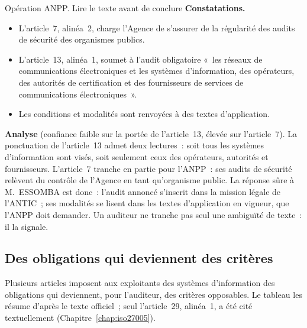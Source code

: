 \begin{boxscenario}{Opération ANPP. Lire le texte avant de conclure}
\textbf{Constatations.}
\begin{itemize}
    \item L'article~7, alinéa~2, charge l'Agence de s'assurer de la
          régularité des audits de sécurité des organismes publics.
    \item L'article~13, alinéa~1, soumet à l'audit obligatoire «~les
          réseaux de communications électroniques et les systèmes
          d'information, des opérateurs, des autorités de certification et
          des fournisseurs de services de communications électroniques~».
    \item Les conditions et modalités sont renvoyées à des textes
          d'application.
\end{itemize}

\textbf{Analyse} (confiance faible sur la portée de l'article~13, élevée
sur l'article~7). La ponctuation de l'article~13 admet deux lectures~:
soit tous les systèmes d'information sont visés, soit seulement ceux des
opérateurs, autorités et fournisseurs. L'article~7 tranche en partie pour
l'ANPP~: ses audits de sécurité relèvent du contrôle de l'Agence en tant
qu'organisme public. La réponse sûre à M.~ESSOMBA est donc~: l'audit
annoncé s'inscrit dans la mission légale de l'ANTIC~; ses modalités se
lisent dans les textes d'application en vigueur, que l'ANPP doit demander.
Un auditeur ne tranche pas seul une ambiguïté de texte~: il la signale.
\end{boxscenario}

\subsection{Des obligations qui deviennent des critères}

Plusieurs articles imposent aux exploitants des systèmes d'information des
obligations qui deviennent, pour l'auditeur, des critères opposables. Le
tableau les résume d'après le texte officiel~; seul l'article~29, alinéa~1,
a été cité textuellement (Chapitre~\ref{chap:iso27005}).

